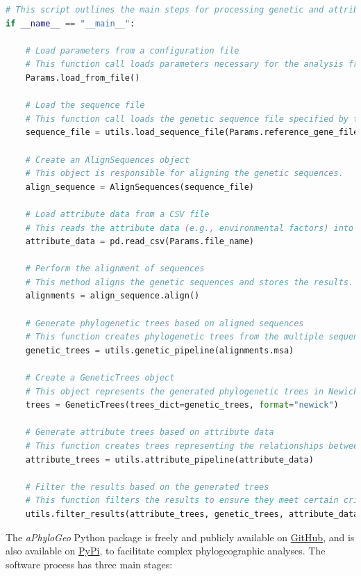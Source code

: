 \begin{lstlisting}[label=lst:main,language=Python,caption=Main script for tutorial using the aPhyloGeo package.]
# This script outlines the main steps for processing genetic and attribute data using the aPhyloGeo package.
if __name__ == "__main__":

    # Load parameters from a configuration file
    # This function call loads parameters necessary for the analysis from a specified file.
    Params.load_from_file()

    # Load the sequence file
    # This function call loads the genetic sequence file specified by the reference gene filepath.
    sequence_file = utils.load_sequence_file(Params.reference_gene_filepath)

    # Create an AlignSequences object
    # This object is responsible for aligning the genetic sequences.
    align_sequence = AlignSequences(sequence_file)

    # Load attribute data from a CSV file
    # This reads the attribute data (e.g., environmental factors) into a pandas DataFrame.
    attribute_data = pd.read_csv(Params.file_name)

    # Perform the alignment of sequences
    # This method aligns the genetic sequences and stores the results.
    alignments = align_sequence.align()

    # Generate phylogenetic trees based on aligned sequences
    # This function creates phylogenetic trees from the multiple sequence alignments.
    genetic_trees = utils.genetic_pipeline(alignments.msa)
    
    # Create a GeneticTrees object
    # This object represents the generated phylogenetic trees in Newick format.
    trees = GeneticTrees(trees_dict=genetic_trees, format="newick")
   
    # Generate attribute trees based on attribute data
    # This function creates trees representing the relationships between different attributes.
    attribute_trees = utils.attribute_pipeline(attribute_data)
    
    # Filter the results based on the generated trees
    # This function filters the results to ensure they meet certain criteria.
    utils.filter_results(attribute_trees, genetic_trees, attribute_data)
\end{lstlisting}

The \textit{aPhyloGeo} Python package is freely and publicly available on \href{https://github.com/tahiri-lab/aPhyloGeo}{GitHub}, and is also available on \href{https://pypi.org/project/aphylogeo/}{PyPi}, to facilitate complex phylogeographic analyses. The software process has three main stages:

